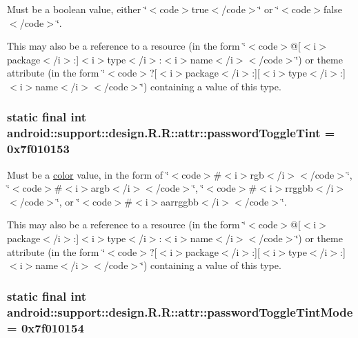 Must be a boolean value, either \char`\"{}$<$code$>$true$<$/code$>$\char`\"{} or \char`\"{}$<$code$>$false$<$/code$>$\char`\"{}. 

This may also be a reference to a resource (in the form \char`\"{}$<$code$>$@\mbox{[}$<$i$>$package$<$/i$>$:\mbox{]}$<$i$>$type$<$/i$>$:$<$i$>$name$<$/i$>$$<$/code$>$\char`\"{}) or theme attribute (in the form \char`\"{}$<$code$>$?\mbox{[}$<$i$>$package$<$/i$>$:\mbox{]}\mbox{[}$<$i$>$type$<$/i$>$:\mbox{]}$<$i$>$name$<$/i$>$$<$/code$>$\char`\"{}) containing a value of this type. \hypertarget{classandroid_1_1support_1_1design_1_1_r_1_1attr_b47fb9c1435cb87a8367ad5b39f7d56d}{
\subsubsection[{passwordToggleTint}]{\setlength{\rightskip}{0pt plus 5cm}static final int android::support::design.R.R::attr::passwordToggleTint = 0x7f010153}}
\label{classandroid_1_1support_1_1design_1_1_r_1_1attr_b47fb9c1435cb87a8367ad5b39f7d56d}


Must be a \hyperlink{classandroid_1_1support_1_1design_1_1_r_1_1color}{color} value, in the form of \char`\"{}$<$code$>$\#$<$i$>$rgb$<$/i$>$$<$/code$>$\char`\"{}, \char`\"{}$<$code$>$\#$<$i$>$argb$<$/i$>$$<$/code$>$\char`\"{}, \char`\"{}$<$code$>$\#$<$i$>$rrggbb$<$/i$>$$<$/code$>$\char`\"{}, or \char`\"{}$<$code$>$\#$<$i$>$aarrggbb$<$/i$>$$<$/code$>$\char`\"{}. 

This may also be a reference to a resource (in the form \char`\"{}$<$code$>$@\mbox{[}$<$i$>$package$<$/i$>$:\mbox{]}$<$i$>$type$<$/i$>$:$<$i$>$name$<$/i$>$$<$/code$>$\char`\"{}) or theme attribute (in the form \char`\"{}$<$code$>$?\mbox{[}$<$i$>$package$<$/i$>$:\mbox{]}\mbox{[}$<$i$>$type$<$/i$>$:\mbox{]}$<$i$>$name$<$/i$>$$<$/code$>$\char`\"{}) containing a value of this type. \hypertarget{classandroid_1_1support_1_1design_1_1_r_1_1attr_d9006700150c5aae3e0de911fee59245}{
\subsubsection[{passwordToggleTintMode}]{\setlength{\rightskip}{0pt plus 5cm}static final int android::support::design.R.R::attr::passwordToggleTintMode = 0x7f010154}}
\label{classandroid_1_1support_1_1design_1_1_r_1_1attr_d9006700150c5aae3e0de911fee59245}


